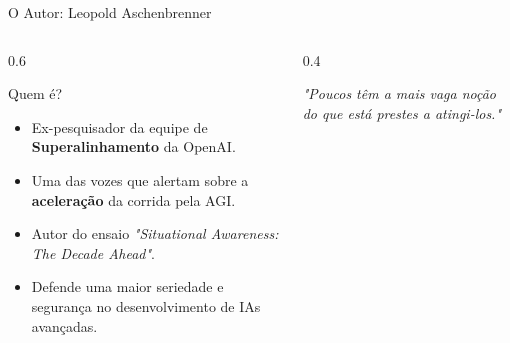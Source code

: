 \documentclass[aspectratio=169,12pt]{beamer}
\begin{document}
\begin{frame}{O Autor: Leopold Aschenbrenner}
    \begin{columns}
        \begin{column}{0.6\textwidth}
            \begin{block}{Quem é?}
                \begin{itemize}
                    \item Ex-pesquisador da equipe de \textbf{Superalinhamento} da OpenAI.
                    \item Uma das vozes que alertam sobre a \textbf{aceleração} da corrida pela AGI.
                    \item Autor do ensaio \textit{"Situational Awareness: The Decade Ahead"}.
                    \item Defende uma maior seriedade e segurança no desenvolvimento de IAs avançadas.
                \end{itemize}
            \end{block}
        \end{column}
        \begin{column}{0.4\textwidth}
            \begin{center}
                {\Huge \faUserSecret}

                \vspace{1cm}
                
                \textit{"Poucos têm a mais vaga noção do que está prestes a atingi-los."}
            \end{center}
        \end{column}
    \end{columns}
\end{frame}
\end{document}
